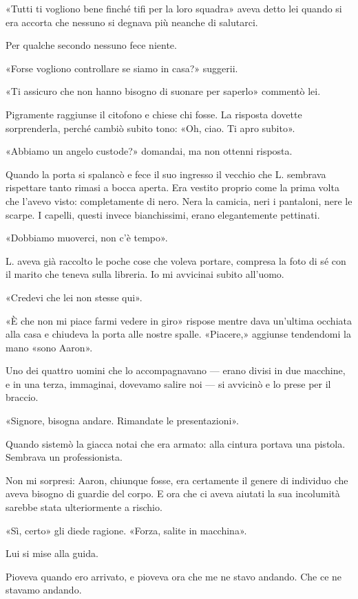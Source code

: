 \documentclass[a4paper,12pt]{book}
\begin{document}
«Tutti ti vogliono bene finché tifi per la loro squadra» aveva detto lei quando
si era accorta che nessuno si degnava più neanche di salutarci.

Per qualche secondo nessuno fece niente.

«Forse vogliono controllare se siamo in casa?» suggerii.

«Ti assicuro che non hanno bisogno di suonare per saperlo» commentò lei.

Pigramente raggiunse il citofono e chiese chi fosse. La risposta dovette
sorprenderla, perché cambiò subito tono: «Oh, ciao. Ti apro subito».

«Abbiamo un angelo custode?» domandai, ma non ottenni risposta.

Quando la porta si spalancò e fece il suo ingresso il vecchio che L. sembrava
rispettare tanto rimasi a bocca aperta. Era vestito proprio come la prima volta
che l'avevo visto: completamente di nero. Nera la camicia, neri i pantaloni,
nere le scarpe. I capelli, questi invece bianchissimi, erano elegantemente
pettinati.

«Dobbiamo muoverci, non c'è tempo».

L. aveva già raccolto le poche cose che voleva portare, compresa la foto di sé
con il marito che teneva sulla libreria. Io mi avvicinai subito all'uomo.

«Credevi che lei non stesse qui».

«È che non mi piace farmi vedere in giro» rispose mentre dava un'ultima occhiata
alla casa e chiudeva la porta alle nostre spalle. «Piacere,» aggiunse tendendomi
la mano «sono Aaron».

Uno dei quattro uomini che lo accompagnavano --- erano divisi in due macchine,
e in una terza, immaginai, dovevamo salire noi --- si avvicinò e lo prese per
il braccio.

«Signore, bisogna andare. Rimandate le presentazioni».

Quando sistemò la giacca notai che era armato: alla cintura portava una pistola.
Sembrava un professionista.

Non mi sorpresi: Aaron, chiunque fosse, era certamente il genere di individuo
che aveva bisogno di guardie del corpo. E ora che ci aveva aiutati la sua
incolumità sarebbe stata ulteriormente a rischio.

«Sì, certo» gli diede ragione. «Forza, salite in macchina».

Lui si mise alla guida.

Pioveva quando ero arrivato, e pioveva ora che me ne stavo andando. Che ce ne
stavamo andando.
\end{document}
